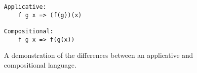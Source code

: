 \begin{figure}[htb]
    \centering
    \begin{lstlisting}
Applicative:
    f g x => (f(g))(x) 

Compositional:
    f g x => f(g(x))
\end{lstlisting}
    \caption{A demonstration of the differences between an applicative and compositional language.}
    \label{fig:applicative_vs_compositional_example}
\end{figure}
